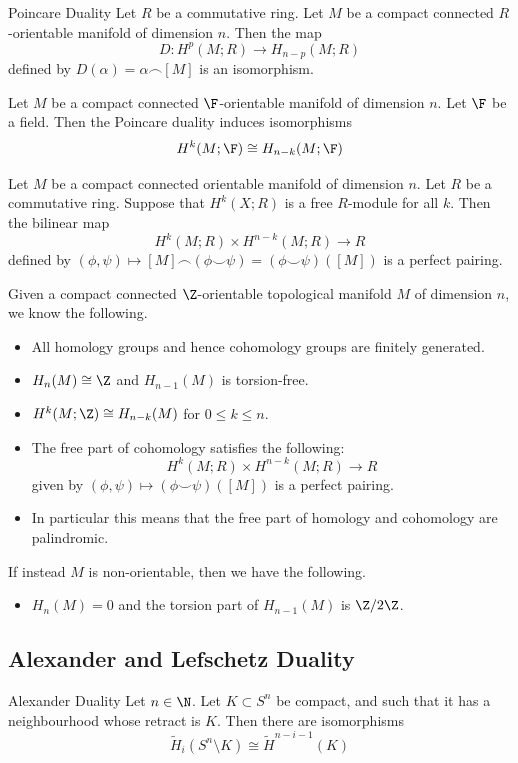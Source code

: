 \documentclass[a4paper]{article}
\begin{document}
\begin{thm}{Poincare Duality}{} Let $R$ be a commutative ring. Let $M$ be a compact connected $R$-orientable manifold of dimension $n$. Then the map $$D:H^p(M;R)\to H_{n-p}(M;R)$$ defined by $D(\alpha)=\alpha\frown[M]$ is an isomorphism. 
\end{thm}

\begin{crl}{}{} Let $M$ be a compact connected $\F$-orientable manifold of dimension $n$. Let $\F$ be a field. Then the Poincare duality induces isomorphisms $$H^k(M;\F)\cong H_{n-k}(M;\F)$$
\end{crl}

\begin{prp}{}{} Let $M$ be a compact connected orientable manifold of dimension $n$. Let $R$ be a commutative ring. Suppose that $H^k(X;R)$ is a free $R$-module for all $k$. Then the bilinear map $$H^k(M;R)\times H^{n-k}(M;R)\to R$$ defined by $(\phi,\psi)\mapsto[M]\frown(\phi\smile\psi)=(\phi\smile\psi)([M])$ is a perfect pairing. 
\end{prp}

Given a compact connected $\Z$-orientable topological manifold $M$ of dimension $n$, we know the following. 
\begin{itemize}
\item All homology groups and hence cohomology groups are finitely generated. 
\item $H_n(M)\cong\Z$ and $H_{n-1}(M)$ is torsion-free. 
\item $H^k(M;\Z)\cong H_{n-k}(M)$ for $0\leq k\leq n$. 
\item The free part of cohomology satisfies the following: $$H^k(M;R)\times H^{n-k}(M;R)\to R$$ given by $(\phi,\psi)\mapsto(\phi\smile\psi)([M])$ is a perfect pairing. 
\item In particular this means that the free part of homology and cohomology are palindromic. 
\end{itemize}

If instead $M$ is non-orientable, then we have the following. 
\begin{itemize}
\item $H_n(M)=0$ and the torsion part of $H_{n-1}(M)$ is $\Z/2\Z$. 
\end{itemize}

\subsection{Alexander and Lefschetz Duality}
\begin{thm}{Alexander Duality}{} Let $n\in\N$. Let $K\subset S^n$ be compact, and such that it has a neighbourhood whose retract is $K$. Then there are isomorphisms $$\widetilde{H}_i(S^n\setminus K)\cong\widetilde{H}^{n-i-1}(K)$$
\end{thm}
\end{document}
